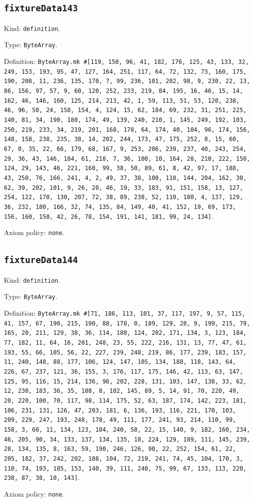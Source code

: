 \documentclass[11pt]{article}
\begin{document}
\subsection*{\texttt{fixtureData143}}
\noindent Kind: \texttt{definition}.\par
\noindent Type: \texttt{ByteArray}.\par
\noindent Definition: \texttt{ByteArray.mk \#[119, 150, 96, 41, 182, 176, 125, 43, 133, 32, 249, 153, 193, 95, 47, 127, 164, 251, 117, 64, 72, 132, 73, 160, 175, 190, 208, 11, 236, 135, 170, 7, 99, 236, 101, 202, 98, 9, 230, 22, 13, 86, 156, 97, 57, 9, 60, 120, 252, 233, 219, 84, 195, 16, 46, 15, 14, 162, 46, 146, 160, 125, 214, 213, 42, 1, 59, 113, 51, 53, 120, 238, 46, 96, 50, 24, 158, 154, 4, 124, 15, 62, 184, 69, 232, 31, 251, 225, 140, 81, 34, 190, 180, 174, 49, 139, 240, 210, 1, 145, 249, 192, 103, 250, 219, 233, 34, 219, 201, 168, 178, 64, 174, 40, 104, 96, 174, 156, 148, 158, 238, 235, 38, 14, 202, 244, 173, 47, 175, 252, 8, 15, 60, 67, 0, 35, 22, 66, 179, 68, 167, 9, 253, 206, 239, 237, 40, 243, 254, 29, 36, 43, 146, 184, 61, 218, 7, 36, 100, 10, 164, 28, 210, 222, 150, 124, 29, 143, 46, 221, 160, 99, 38, 50, 89, 61, 8, 42, 97, 17, 188, 43, 250, 76, 166, 241, 4, 2, 49, 37, 38, 100, 110, 144, 204, 162, 30, 62, 39, 202, 101, 9, 26, 20, 46, 19, 33, 183, 91, 151, 158, 13, 127, 254, 122, 170, 130, 207, 72, 38, 89, 238, 52, 110, 180, 4, 137, 129, 36, 232, 180, 166, 32, 74, 135, 84, 149, 40, 41, 152, 19, 69, 173, 156, 160, 150, 42, 26, 78, 154, 191, 141, 181, 99, 24, 134]}.\par
\noindent Axiom policy: \texttt{none}.\par
\subsection*{\texttt{fixtureData144}}
\noindent Kind: \texttt{definition}.\par
\noindent Type: \texttt{ByteArray}.\par
\noindent Definition: \texttt{ByteArray.mk \#[71, 186, 113, 101, 37, 117, 197, 9, 57, 115, 41, 157, 67, 190, 215, 190, 88, 178, 0, 189, 129, 28, 9, 199, 215, 79, 165, 20, 211, 129, 38, 36, 114, 180, 124, 202, 171, 134, 3, 123, 184, 77, 182, 11, 64, 16, 201, 248, 23, 55, 222, 216, 131, 13, 77, 47, 61, 193, 55, 66, 105, 56, 22, 227, 239, 248, 219, 86, 177, 239, 183, 157, 11, 240, 148, 88, 177, 106, 124, 147, 105, 134, 188, 118, 143, 64, 226, 67, 237, 121, 36, 155, 3, 176, 117, 175, 146, 42, 113, 63, 147, 125, 95, 116, 15, 214, 136, 96, 202, 228, 131, 103, 147, 138, 33, 62, 12, 230, 183, 36, 35, 188, 8, 102, 145, 89, 5, 14, 91, 70, 220, 49, 20, 220, 100, 70, 117, 98, 114, 175, 52, 63, 187, 174, 142, 223, 181, 106, 231, 131, 126, 47, 203, 181, 6, 136, 193, 116, 221, 170, 103, 209, 229, 247, 193, 248, 178, 49, 111, 177, 241, 93, 214, 110, 99, 158, 3, 60, 11, 134, 123, 104, 240, 58, 22, 15, 140, 9, 182, 160, 234, 46, 205, 90, 34, 133, 137, 134, 135, 18, 224, 129, 189, 111, 145, 239, 28, 134, 135, 8, 163, 59, 190, 246, 126, 90, 22, 252, 154, 61, 22, 205, 182, 37, 242, 202, 188, 104, 72, 219, 241, 74, 45, 104, 170, 3, 110, 74, 193, 185, 153, 140, 39, 111, 240, 75, 99, 67, 133, 113, 220, 238, 87, 38, 10, 143]}.\par
\noindent Axiom policy: \texttt{none}.\par
\end{document}
